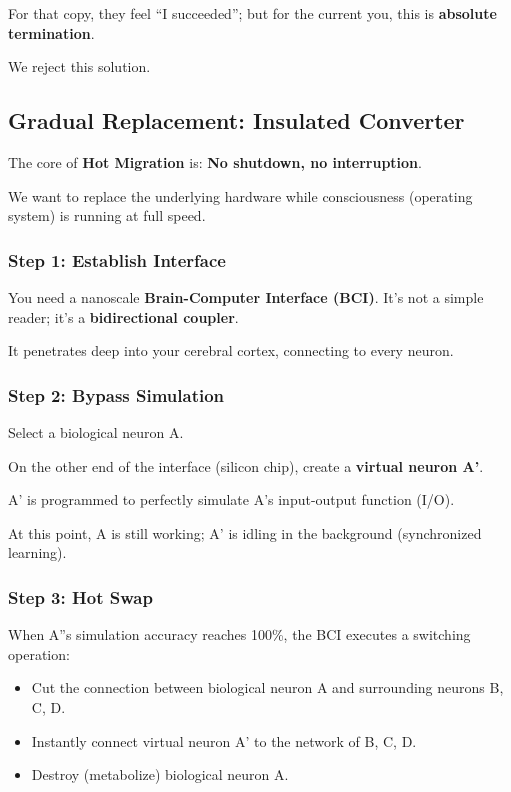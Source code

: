 For that copy, they feel ``I succeeded''; but for the current you, this is \textbf{absolute termination}.

We reject this solution.

\subsection{Gradual Replacement: Insulated Converter}

The core of \textbf{Hot Migration} is: \textbf{No shutdown, no interruption}.

We want to replace the underlying hardware while consciousness (operating system) is running at full speed.

\subsubsection{Step 1: Establish Interface}

You need a nanoscale \textbf{Brain-Computer Interface (BCI)}. It's not a simple reader; it's a \textbf{bidirectional coupler}.

It penetrates deep into your cerebral cortex, connecting to every neuron.

\subsubsection{Step 2: Bypass Simulation}

Select a biological neuron A.

On the other end of the interface (silicon chip), create a \textbf{virtual neuron A'}.

A' is programmed to perfectly simulate A's input-output function (I/O).

At this point, A is still working; A' is idling in the background (synchronized learning).

\subsubsection{Step 3: Hot Swap}

When A''s simulation accuracy reaches 100\%, the BCI executes a switching operation:

\begin{itemize}
\item Cut the connection between biological neuron A and surrounding neurons B, C, D.

\item Instantly connect virtual neuron A' to the network of B, C, D.

\item Destroy (metabolize) biological neuron A.
\end{itemize}

